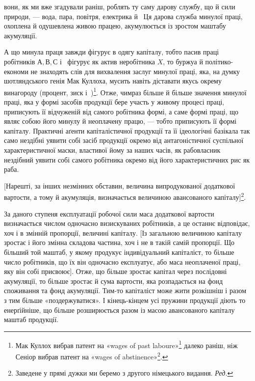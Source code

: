 \parcont{}  %
вони, як ми вже згадували раніш, роблять ту саму дарову службу,
що й сили природи, — вода, пара, повітря, електрика й~
Ця дарова служба минулої праці, охоплена й одушевлена живою
працею, акумулюється із зростом маштабу акумуляції.

А що минула праця завжди фігурує в одягу капіталу, тобто
пасив праці робітників $А, В, С$ і~ фігурує як актив неробітника
$X$, то буржуа й політико-економи не знаходять слів
для вихвалення заслуг минулої праці, яка, на думку шотляндського
генія Мак Куллоха, мусить навіть діставати якусь окрему
винагороду (процент, зиск і~)\footnote{
Мак Куллох вибрав патент на «wages of past laboure»\footnote*{
винагороду за минулу працю. \emph{Ред.}
} далеко раніш, ніж Сеніор вибрав патент на «wages of abstinence»\footnote*{
винагороду за поздержливість. \emph{Ред.}
}.
}. Отже, чимраз більше й
більше значення минулої праці, яка у формі засобів продукції
бере участь у живому процесі праці, приписують її відчуженій
від самого робітника формі, а саме формі праці, що являє собою
його минулу й неоплачену працю, — тобто приписують її
формі капіталу. Практичні аґенти капіталістичної продукції
та її ідеологічні базікала так само нездібні уявити собі засіб
продукції окремо від антагоністичної суспільної характеристичної
маски, властивої йому за наших часів, як рабовласник
нездібний уявити собі самого робітника окремо від його характеристичних
рис як раба.

[Нарешті, за інших незмінних обставин, величина випродукованої
додаткової вартости, а тому й акумуляція, визначається
величиною авансованого капіталу]\footnote*{Заведене у прямі дужки ми беремо з другого німецького видання.
\emph{Ред.}}.

За даного ступеня експлуатації робочої сили маса додаткової
вартости визначається числом одночасно визискуваних робітників,
а це останнє відповідає, хоч і в змінній пропорції, величині
капіталу. [Із загальною величиною капіталу зростає і його
змінна складова частина, хоч і не в такій самій пропорції. Що
більший той маштаб, у якому продукує індивідуальний капіталіст,
то більше число робітників, що їх він одночасно експлуатує,
або маса неоплаченої праці, яку він собі присвоює]. Отже,
що більше зростає капітал через послідовні акумуляції, то більше
зростає й сума вартости, яка розпадається на фонд споживання
та фонд акумуляції. Тим-то капіталіст може жити розкішніш
і разом з тим більше «поздержуватися». І кінець-кінцем усі
пружини продукції діють то енерґійніше, що більше розширюється
разом із масою авансованого капіталу маштаб продукції.
